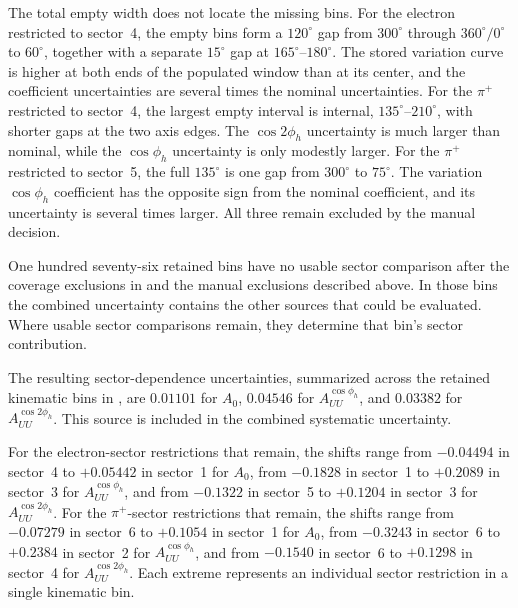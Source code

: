 The total empty width does not locate the missing bins. For the electron restricted to sector~4, the empty bins form a $120^{\circ}$ gap from $300^{\circ}$ through $360^{\circ}/0^{\circ}$ to $60^{\circ}$, together with a separate $15^{\circ}$ gap at $165^{\circ}$--$180^{\circ}$. The stored variation curve is higher at both ends of the populated window than at its center, and the coefficient uncertainties are several times the nominal uncertainties. For the $\pi^{+}$ restricted to sector~4, the largest empty interval is internal, $135^{\circ}$--$210^{\circ}$, with shorter gaps at the two axis edges. The $\cos 2\phi_h$ uncertainty is much larger than nominal, while the $\cos\phi_h$ uncertainty is only modestly larger. For the $\pi^{+}$ restricted to sector~5, the full $135^{\circ}$ is one gap from $300^{\circ}$ to $75^{\circ}$. The variation $\cos\phi_h$ coefficient has the opposite sign from the nominal coefficient, and its uncertainty is several times larger. All three remain excluded by the manual decision.

One hundred seventy-six retained bins have no usable sector comparison after the coverage exclusions in  and the manual exclusions described above. In those bins the combined uncertainty contains the other sources that could be evaluated. Where usable sector comparisons remain, they determine that bin's sector contribution.

% 

The resulting sector-dependence uncertainties, summarized across the retained kinematic bins in , are $0.01101$ for $A_{0}$, $0.04546$ for $A_{UU}^{\cos\phi_h}$, and $0.03382$ for $A_{UU}^{\cos 2\phi_h}$. This source is included in the combined systematic uncertainty.

For the electron-sector restrictions that remain, the shifts range from $-0.04494$ in sector~4 to $+0.05442$ in sector~1 for $A_{0}$, from $-0.1828$ in sector~1 to $+0.2089$ in sector~3 for $A_{UU}^{\cos\phi_h}$, and from $-0.1322$ in sector~5 to $+0.1204$ in sector~3 for $A_{UU}^{\cos 2\phi_h}$. For the $\pi^{+}$-sector restrictions that remain, the shifts range from $-0.07279$ in sector~6 to $+0.1054$ in sector~1 for $A_{0}$, from $-0.3243$ in sector~6 to $+0.2384$ in sector~2 for $A_{UU}^{\cos\phi_h}$, and from $-0.1540$ in sector~6 to $+0.1298$ in sector~4 for $A_{UU}^{\cos 2\phi_h}$. Each extreme represents an individual sector restriction in a single kinematic bin.

